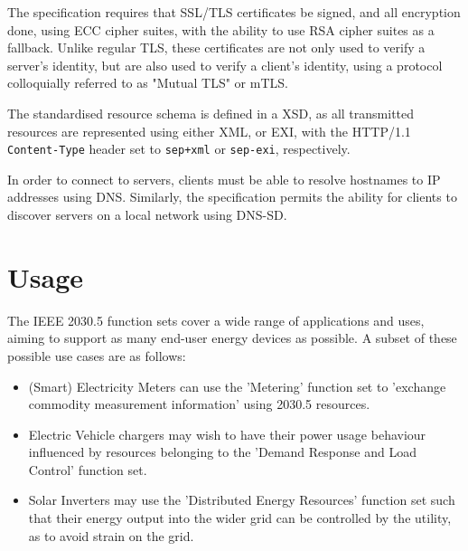 The specification requires that SSL/TLS certificates be signed, and all encryption done, using ECC cipher suites, with the ability to use RSA cipher suites as a fallback. Unlike regular TLS, these certificates are not only used to verify a server's identity, but are also used to verify a client's identity, using a protocol colloquially referred to as "Mutual TLS" or mTLS.

The standardised resource schema is defined in a XSD, as all transmitted resources are represented using either XML, or EXI, with the HTTP/1.1 \texttt{Content-Type} header set to \texttt{sep+xml} or \texttt{sep-exi}, respectively.

In order to connect to servers, clients must be able to resolve hostnames to IP addresses using DNS. Similarly, the specification permits the ability for clients to discover servers on a local network using DNS-SD.

\section{Usage}
The IEEE 2030.5 function sets cover a wide range of applications and uses, aiming to support as many end-user energy devices as possible. A subset of these possible use cases are as follows:
\begin{itemize}
    \item (Smart) Electricity Meters can use the 'Metering' function set to 'exchange commodity measurement information' using 2030.5 resources. \cite{IEEE2030.5}
    \item Electric Vehicle chargers may wish to have their power usage behaviour influenced by resources belonging to the 'Demand Response and Load Control' function set.
    \item Solar Inverters may use the 'Distributed Energy Resources' function set such that their energy output into the wider grid can be controlled by the utility, as to avoid strain on the grid.
\end{itemize}
